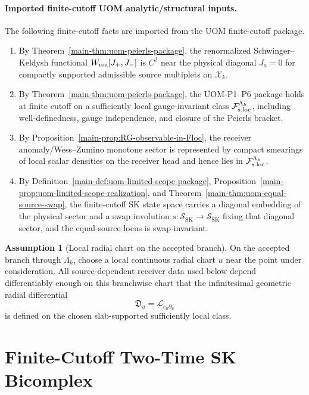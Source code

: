 \documentclass[11pt]{article}
\theoremstyle{definition}
\newtheorem{assumption}[definition]{Assumption}
\theoremstyle{plain}
\theoremstyle{remark}
\newcommand{\Fsloc}{\mathcal F_{\rm s.loc}}
\newcommand{\Xscr}{\mathscr X}
\newcommand{\Du}{\mathfrak D_u}
\newcommand{\SK}{\mathrm{SK}}
\newcommand{\Lie}{\mathcal L}
\begin{document}
\paragraph{Imported finite-cutoff UOM analytic/structural inputs.}
The following finite-cutoff facts are imported from the UOM finite-cutoff package.
\begin{enumerate}[leftmargin=2em]
\item By Theorem~\ref{main-thm:uom-peierls-package}, the renormalized
  Schwinger--Keldysh functional \(W_{\rm ren}[J_+,J_-]\) is \(C^2\) near the
  physical diagonal \(J_a=0\) for compactly supported admissible source multiplets on
  \(\Xscr_k\).
\item By Theorem~\ref{main-thm:uom-peierls-package}, the UOM-P1--P6 package holds at finite cutoff on a
  sufficiently local gauge-invariant class
  \(\Fsloc^{\Lambda_k}\), including well-definedness, gauge independence, and closure of the
  Peierls bracket.
\item By Proposition~\ref{main-prop:RG-observable-in-Floc}, the receiver anomaly/Wess--Zumino monotone sector
  is represented by compact smearings of local
  scalar densities on the receiver head and hence lies in \(\Fsloc^{\Lambda_k}\).
\item By Definition~\ref{main-def:uom-limited-scope-package},
  Proposition~\ref{main-prop:uom-limited-scope-realization},
  and Theorem~\ref{main-thm:uom-equal-source-swap},
  the finite-cutoff SK state space carries a diagonal embedding of the physical sector and a swap
  involution \(s:\mathcal S_{\SK}\to\mathcal S_{\SK}\) fixing that diagonal sector, and the
  equal-source locus is swap-invariant.
\end{enumerate}

\begin{assumption}[Local radial chart on the accepted branch]
\label{ass:uomdesc-u-chart}
On the accepted branch through \(\Lambda_k\), choose a local continuous radial chart \(u\) near the
point under consideration.
All source-dependent receiver data used below depend differentiably enough on this branchwise chart
that the infinitesimal geometric radial differential
\[
\Du=\Lie_{c_u\partial_u}
\]
is defined on the chosen slab-supported sufficiently local class.
\end{assumption}

\section{Finite-Cutoff Two-Time SK Bicomplex}
\label{sec:uomdesc-bicomplex}
\end{document}
